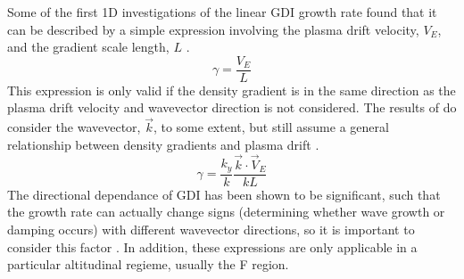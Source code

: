 Some of the first 1D investigations of the linear GDI growth rate found that it can be described by a simple expression involving the plasma drift velocity, \(V_E\), and the gradient scale length, \(L\) \citep{Simon1963,Hoh1963,Linson1970}.
\begin{equation}
	\label{eqn:gdi_old}
	\gamma = \frac{V_E}{L}
\end{equation}
This expression is only valid if the density gradient is in the same direction as the plasma drift velocity and wavevector direction is not considered.  The results of \citet{Keskinen1982,Keskinen1983} do consider the wavevector, \(\vec{k}\), to some extent, but still assume a general relationship between density gradients and plasma drift \citep{Tsunoda1988}.
\begin{equation}
	\label{eqn:gdi_80s}
	\gamma = \frac{k_y}{k}\frac{\vec{k}\cdot\vec{V}_E}{kL}
\end{equation}
The directional dependance of GDI has been shown to be significant, such that the growth rate can actually change signs (determining whether wave growth or damping occurs) with different wavevector directions, so it is important to consider this factor \citep{Makarevich2014c}.  In addition, these expressions are only applicable in a particular altitudinal regieme, usually the F region.

